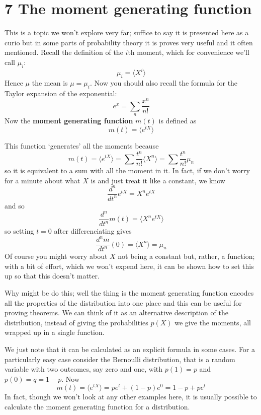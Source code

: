 \documentclass[11pt,a4paper]{scrartcl}
\begin{document}
\section*{7 The moment generating function}

This is a topic we won't explore very far; suffice to say it is
presented here as a curio but in some parts of probability theory it
is proves very useful and it often mentioned. Recall the definition of the $i$th moment, which for convenience we'll call $\mu_i$:
\begin{equation}
\mu_i=\langle X^i\rangle
\end{equation}
Hence $\mu$ the mean is $\mu=\mu_i$. Now you should also recall the
formula for the Taylor expansion of the exponential:
\begin{equation}
e^x=\sum_n \frac{x^n}{n!}
\end{equation}
Now the \textbf{moment generating function} $m(t)$ is defined as
\begin{equation}
m(t)=\langle e^{tX}\rangle
\end{equation}

This function \lq{}generates\rq{} all the moments because 
\begin{equation}
m(t)=\langle e^{tX}\rangle=\sum \frac{t^n}{n!}\langle X^n\rangle =\sum \frac{t^n}{n!}\mu_n
\end{equation}
so it is equivalent to a sum with all the moment in it. In fact, if we
don't worry for a minute about what $X$ is and just treat it like a
constant, we know
\begin{equation}
\frac{d^n}{dt^n}e^{tX}=X^ne^{tX}
\end{equation}
and so
\begin{equation}
\frac{d^n}{dt^n}m(t)=\langle X^ne^{tX}\rangle
\end{equation}
so setting $t=0$ after differenciating gives
\begin{equation}
\frac{d^nm}{dt^n}(0)=\langle X^n\rangle=\mu_n
\end{equation}
Of course you might worry about $X$ not being a constant but, rather,
a function; with a bit of effort, which we won't expend here, it can
be shown how to set this up so that this doesn't matter.

Why might be do this; well the thing is the moment generating function
encodes all the properties of the distribution into one place and this
can be useful for proving theorems. We can think of it as an
alternative description of the distribution, instead of giving the
probabilities $p(X)$ we give the moments, all wrapped up in a single
function.


We just note that it can be
calculated as an explicit formula in some cases. For a particularly
easy case consider the Bernoulli distribution, that is a random
variable with two outcomes, say zero and one, with $p(1)=p$ and $p(0)=q=1-p$. Now
\begin{equation}
m(t)=\langle e^{tX}\rangle=pe^t+(1-p)e^0=1-p+pe^t
\end{equation}
In fact, though we won't look at any other examples here, it is
usually possible to calculate the moment generating function for a
distribution.

\newpage


\end{document}
